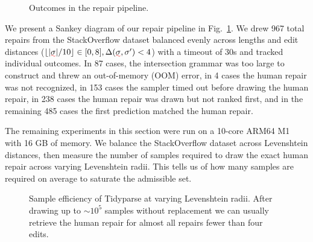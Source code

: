 \documentclass[sigplan,review,acmsmall,nonacm,anonymous]{acmart}\settopmatter{printfolios=false,printccs=false,printacmref=false}
\begin{document}
  \begin{figure}
    \vspace{-1.5cm}
    \hspace{-0.8cm}
    \resizebox{.53\textwidth}{!}{}
    \vspace{-1.8cm}
    \caption{Outcomes in the repair pipeline.}
    \label{fig:sankey}
  \end{figure}


  We present a Sankey diagram of our repair pipeline in Fig.~\ref{fig:sankey}. We drew 967 total repairs from the StackOverflow dataset balanced evenly across lengths and edit distances ($\lfloor|\err\sigma| / 10\rfloor \in [0, 8], \Delta(\err\sigma, \sigma') < 4$) with a timeout of 30s and tracked individual outcomes. In 87 cases, the intersection grammar was too large to construct and threw an out-of-memory (OOM) error, in 4 cases the human repair was not recognized, in 153 cases the sampler timed out before drawing the human repair, in 238 cases the human repair was drawn but not ranked first, and in the remaining 485 cases the first prediction matched the human repair.

  \clearpage The remaining experiments in this section were run on a 10-core ARM64 M1 with 16 GB of memory. We balance the StackOverflow dataset across Levenshtein distances, then measure the number of samples required to draw the exact human repair across varying Levenshtein radii. This tells us of how many samples are required on average to saturate the admissible set.

  \begin{figure}[h!]
    
    \caption{Sample efficiency of Tidyparse at varying Levenshtein radii. After drawing up to $\sim10^5$ samples without replacement we can usually retrieve the human repair for almost all repairs fewer than four edits.}\label{fig:sample_efficiency}
  \end{figure}

\end{document}

